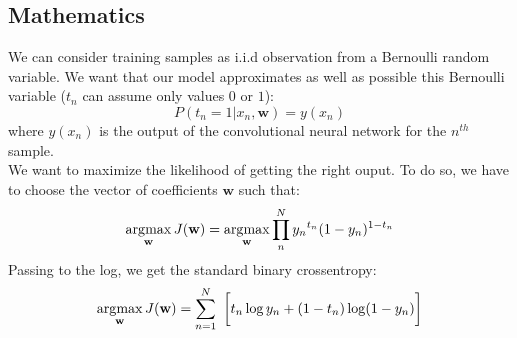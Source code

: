 \subsection{Mathematics}
We can consider training samples as i.i.d observation from a Bernoulli random variable. We want that our model approximates as well as possible this Bernoulli variable ($t_n$ can assume only values $0$ or $1$):
\begin{equation}
P(t_n = 1|x_n, \textbf{w}) = y(x_n)
\end{equation}
where $y(x_n)$ is the output of the convolutional neural network for the $n^{th}$ sample.
\\
We want to maximize the likelihood of getting the right ouput. To do so, we have to choose the vector of coefficients $\textbf{w}$ such that:
\begin{equation}
\operatorname*{\arg\!\max} _{\textbf{w}} J(\textbf{w}) = \operatorname*{\arg\!\max} _{\textbf{w}} \prod _n^N {y_n}^{t_n}(1-y_n)^{1-t_n}
\end{equation}
Passing to the log, we get the standard binary crossentropy:
\begin{equation}
\operatorname*{\arg\!\max} _{\textbf{w}} J(\textbf{w}) = \sum _{n=1}^{N}\ {\bigg [}t_{n}\log {y_n}+(1-t_{n})\log(1-{y_n}){\bigg ]}
\end{equation}


